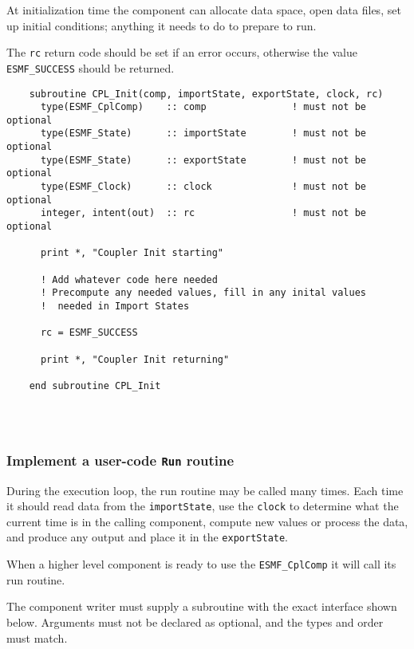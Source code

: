    At initialization time the component can allocate data space, open
   data files, set up initial conditions; anything it needs to do to
   prepare to run.
  
   The {\tt rc} return code should be set if an error occurs, otherwise
   the value {\tt ESMF\_SUCCESS} should be returned. 

 \begin{verbatim}
    subroutine CPL_Init(comp, importState, exportState, clock, rc)
      type(ESMF_CplComp)    :: comp               ! must not be optional
      type(ESMF_State)      :: importState        ! must not be optional
      type(ESMF_State)      :: exportState        ! must not be optional
      type(ESMF_Clock)      :: clock              ! must not be optional
      integer, intent(out)  :: rc                 ! must not be optional

      print *, "Coupler Init starting"
    
      ! Add whatever code here needed
      ! Precompute any needed values, fill in any inital values
      !  needed in Import States

      rc = ESMF_SUCCESS

      print *, "Coupler Init returning"
   
    end subroutine CPL_Init
 
\end{verbatim}
 
 
\mbox{}\hrulefill\ 
 

  \subsubsection{Implement a user-code {\tt Run} routine}
   
   \label{sec:CplRun}
  
   During the execution loop, the run routine may be called many times.
   Each time it should read data from the {\tt importState}, use the
   {\tt clock} to determine what the current time is in the calling
   component, compute new values or process the data, 
   and produce any output and place it in the {\tt exportState}.
  
   When a higher level component is ready to use the {\tt ESMF\_CplComp}
   it will call its run routine.
  
   The component writer must supply a subroutine with the exact interface 
   shown below. Arguments must not be declared as optional, and the types and
   order must match.
  
